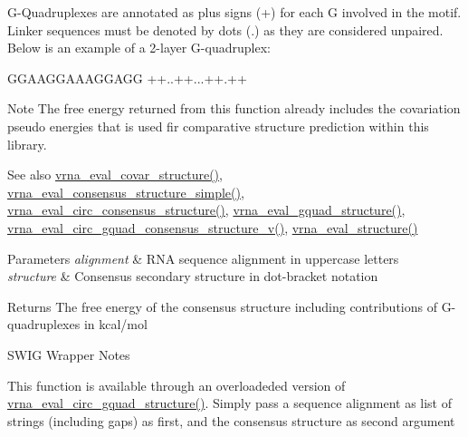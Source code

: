 G-\/\+Quadruplexes are annotated as plus signs (\textquotesingle{}+\textquotesingle{}) for each G involved in the motif. Linker sequences must be denoted by dots (\textquotesingle{}.\textquotesingle{}) as they are considered unpaired. Below is an example of a 2-\/layer G-\/quadruplex\+: 
\begin{DoxyCode}
GGAAGGAAAGGAGG
++..++...++.++
\end{DoxyCode}


\begin{DoxyNote}{Note}
The free energy returned from this function already includes the covariation pseudo energies that is used fir comparative structure prediction within this library.
\end{DoxyNote}
\begin{DoxySeeAlso}{See also}
\hyperlink{group__eval_ga6cea75c0eb9857fb59172be54cab09e0}{vrna\+\_\+eval\+\_\+covar\+\_\+structure()}, \hyperlink{group__eval_ga7762c3a7bdcbc3a14ef93259d322c7d6}{vrna\+\_\+eval\+\_\+consensus\+\_\+structure\+\_\+simple()}, \hyperlink{group__eval_gac96577cf232c71160f762737a994b7c6}{vrna\+\_\+eval\+\_\+circ\+\_\+consensus\+\_\+structure()}, \hyperlink{group__eval_ga3263504825ef4b523eba797c99921df4}{vrna\+\_\+eval\+\_\+gquad\+\_\+structure()}, \hyperlink{group__eval_gaecd3e17292a0b3927277434019a5e187}{vrna\+\_\+eval\+\_\+circ\+\_\+gquad\+\_\+consensus\+\_\+structure\+\_\+v()}, \hyperlink{group__eval_ga58f199f1438d794a265f3b27fc8ea631}{vrna\+\_\+eval\+\_\+structure()}
\end{DoxySeeAlso}

\begin{DoxyParams}{Parameters}
{\em alignment} & R\+NA sequence alignment in uppercase letters \\
\hline
{\em structure} & Consensus secondary structure in dot-\/bracket notation \\
\hline
\end{DoxyParams}
\begin{DoxyReturn}{Returns}
The free energy of the consensus structure including contributions of G-\/quadruplexes in kcal/mol
\end{DoxyReturn}
\begin{DoxyRefDesc}{S\+W\+I\+G Wrapper Notes}
\item[\hyperlink{wrappers__wrappers000048}{S\+W\+I\+G Wrapper Notes}]This function is available through an overloadeded version of \hyperlink{group__eval_ga9dba2fc5d7e6ad1359a7c2f350589c0e}{vrna\+\_\+eval\+\_\+circ\+\_\+gquad\+\_\+structure()}. Simply pass a sequence alignment as list of strings (including gaps) as first, and the consensus structure as second argument \end{DoxyRefDesc}
\mbox{\label{group__eval_ga1c07851f6b665c3461a19e9e4eb33d26}} 
